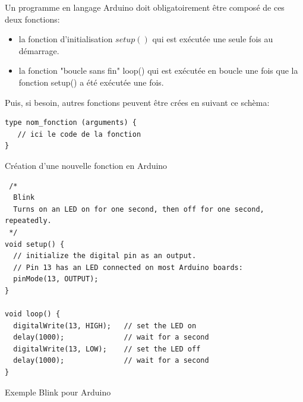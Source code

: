 Un programme en langage Arduino doit obligatoirement être composé de ces deux fonctions:
\begin{itemize}
 \item la fonction d'initialisation $setup()$ qui est exécutée une seule fois au démarrage.
 \item la fonction "boucle sans fin" loop() qui est exécutée en boucle une fois que la fonction setup() a été exécutée une fois. 
\end{itemize}

Puis, si besoin, autres fonctions peuvent être crées en suivant ce schèma:   
\begin{table}[h]
\begin{lstlisting}
type nom_fonction (arguments) {
   // ici le code de la fonction
}
\end{lstlisting}
\caption{Création d'une nouvelle fonction en Arduino}
\end{table}


\begin{table}[h]
\begin{lstlisting}
 /*
  Blink
  Turns on an LED on for one second, then off for one second, repeatedly.
 */
void setup() {                
  // initialize the digital pin as an output.
  // Pin 13 has an LED connected on most Arduino boards:
  pinMode(13, OUTPUT);     
}

void loop() {
  digitalWrite(13, HIGH);   // set the LED on
  delay(1000);              // wait for a second
  digitalWrite(13, LOW);    // set the LED off
  delay(1000);              // wait for a second
}
\end{lstlisting}
\caption{Exemple Blink pour Arduino}
\end{table}




